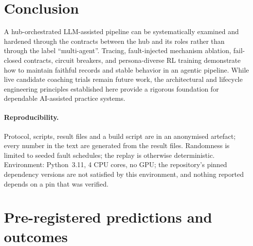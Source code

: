 \documentclass[runningheads]{llncs}
\begin{document}
\section{Conclusion}
A hub-orchestrated LLM-assisted pipeline can be systematically examined and hardened through the contracts between the hub and its roles rather than through the label ``multi-agent''. Tracing, fault-injected mechanism ablation, fail-closed contracts, circuit breakers, and persona-diverse RL training demonstrate how to maintain faithful records and stable behavior in an agentic pipeline. While live candidate coaching trials remain future work, the architectural and lifecycle engineering principles established here provide a rigorous foundation for dependable AI-assisted practice systems.


\paragraph{Reproducibility.} Protocol, scripts, result files and a build script are in an anonymised artefact; every number in the text are generated from the result files. Randomness is limited to seeded fault schedules; the replay is otherwise deterministic. Environment: Python~3.11, 4 CPU cores, no GPU; the repository's pinned dependency versions are not satisfied by this environment, and nothing reported depends on a pin that was verified.




\clearpage
\appendix
\section{Pre-registered predictions and outcomes}

\end{document}
